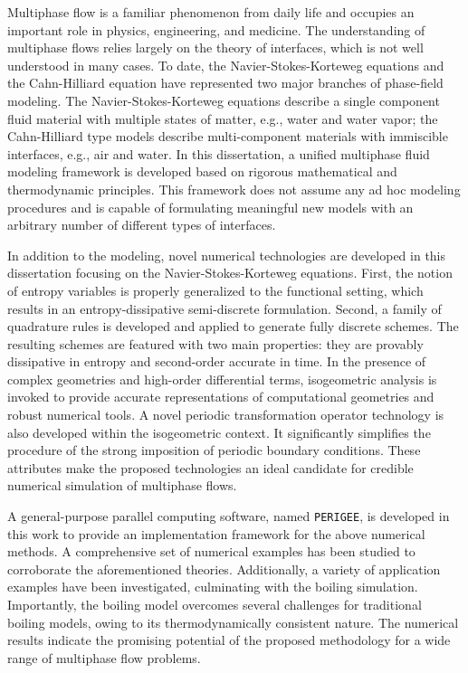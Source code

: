 \documentclass[12pt]{report} %
\begin{document}
%
\utabstract
{}%
\indent
Multiphase flow is a familiar phenomenon from daily life and occupies an important role in physics, engineering, and medicine. The understanding of multiphase flows relies largely on the theory of interfaces, which is not well understood in many cases. To date, the Navier-Stokes-Korteweg equations \cite{Korteweg1901,Waals1979} and the Cahn-Hilliard equation \cite{Cahn1958} have represented two major branches of phase-field modeling. The Navier-Stokes-Korteweg equations describe a single component fluid material with multiple states of matter, e.g., water and water vapor; the Cahn-Hilliard type models describe multi-component materials with immiscible interfaces, e.g., air and water. In this dissertation, a unified multiphase fluid modeling framework is developed based on rigorous mathematical and thermodynamic principles. This framework does not assume any ad hoc modeling procedures and is capable of formulating meaningful new models with an arbitrary number of different types of interfaces.

In addition to the modeling, novel numerical technologies are developed in this dissertation focusing on the Navier-Stokes-Korteweg equations. First, the notion of entropy variables is properly generalized to the functional setting, which results in an entropy-dissipative semi-discrete formulation. Second, a family of quadrature rules is developed and applied to generate fully discrete schemes. The resulting schemes are featured with two main properties: they are provably dissipative in entropy and second-order accurate in time. In the presence of complex geometries and high-order differential terms, isogeometric analysis \cite{Hughes2005} is invoked to provide accurate representations of computational geometries and robust numerical tools. A novel periodic transformation operator technology is also developed within the isogeometric context. It significantly simplifies the procedure of the strong imposition of periodic boundary conditions. These attributes make the proposed technologies an ideal candidate for credible numerical simulation of multiphase flows.

A general-purpose parallel computing software, named \texttt{PERIGEE}, is developed in this work to provide an implementation framework for the above numerical methods. A comprehensive set of numerical examples has been studied to corroborate the aforementioned theories. Additionally, a variety of application examples have been investigated, culminating with the boiling simulation. Importantly, the boiling model overcomes several challenges for traditional boiling models, owing to its thermodynamically consistent nature. The numerical results indicate the promising potential of the proposed methodology for a wide range of multiphase flow problems.
\end{document}
